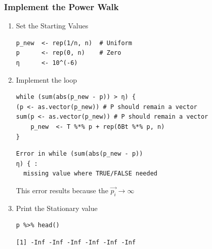 \documentclass[11pt]{article}
\begin{document}
\subsubsection{Implement the Power Walk}
\label{sec:org062cf81}
\begin{enumerate}
\item Set the Starting Values
\label{sec:orgeaa690e}
\lstset{language=r,label= ,caption= ,captionpos=b,numbers=none}
\begin{lstlisting}
p_new  <- rep(1/n, n)  # Uniform
p      <- rep(0, n)    # Zero
η      <- 10^(-6)
\end{lstlisting}

\item Implement the loop
\label{sec:org1a46e7c}
\lstset{language=r,label= ,caption= ,captionpos=b,numbers=none}
\begin{lstlisting}
while (sum(abs(p_new - p)) > η) {
(p <- as.vector(p_new)) # P should remain a vector
sum(p <- as.vector(p_new)) # P should remain a vector
    p_new  <- T %*% p + rep(δBt %*% p, n)
}
\end{lstlisting}

\begin{verbatim}
Error in while (sum(abs(p_new - p))
η) { :
  missing value where TRUE/FALSE needed
\end{verbatim}


This error results because the \(\vec{p_{i}} \rightarrow \infty\)

\item Print the Stationary value
\label{sec:org5bcec24}
\lstset{language=r,label= ,caption= ,captionpos=b,numbers=none}
\begin{lstlisting}
p %>% head()
\end{lstlisting}

\begin{verbatim}
[1] -Inf -Inf -Inf -Inf -Inf -Inf
\end{verbatim}
\end{enumerate}
\end{document}
